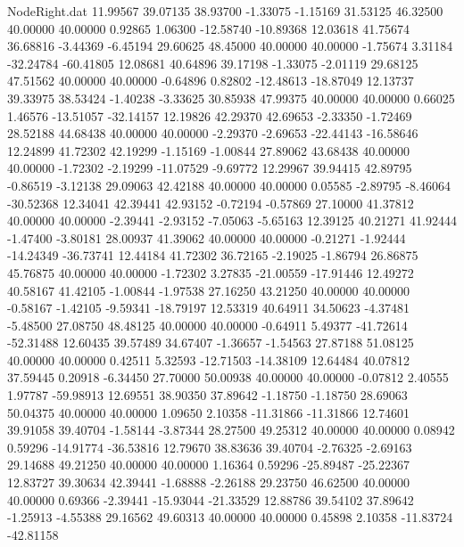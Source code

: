 \begin{filecontents}{NodeRight.dat}
  11.99567   39.07135   38.93700    -1.33075   -1.15169   31.53125   46.32500   40.00000   40.00000    0.92865    1.06300  -12.58740  -10.89368
  12.03618   41.75674   36.68816    -3.44369   -6.45194   29.60625   48.45000   40.00000   40.00000   -1.75674    3.31184  -32.24784  -60.41805
  12.08681   40.64896   39.17198    -1.33075   -2.01119   29.68125   47.51562   40.00000   40.00000   -0.64896    0.82802  -12.48613  -18.87049
  12.13737   39.33975   38.53424    -1.40238   -3.33625   30.85938   47.99375   40.00000   40.00000    0.66025    1.46576  -13.51057  -32.14157
  12.19826   42.29370   42.69653    -2.33350   -1.72469   28.52188   44.68438   40.00000   40.00000   -2.29370   -2.69653  -22.44143  -16.58646
  12.24899   41.72302   42.19299    -1.15169   -1.00844   27.89062   43.68438   40.00000   40.00000   -1.72302   -2.19299  -11.07529   -9.69772
  12.29967   39.94415   42.89795    -0.86519   -3.12138   29.09063   42.42188   40.00000   40.00000    0.05585   -2.89795   -8.46064  -30.52368
  12.34041   42.39441   42.93152    -0.72194   -0.57869   27.10000   41.37812   40.00000   40.00000   -2.39441   -2.93152   -7.05063   -5.65163
  12.39125   40.21271   41.92444    -1.47400   -3.80181   28.00937   41.39062   40.00000   40.00000   -0.21271   -1.92444  -14.24349  -36.73741
  12.44184   41.72302   36.72165    -2.19025   -1.86794   26.86875   45.76875   40.00000   40.00000   -1.72302    3.27835  -21.00559  -17.91446
  12.49272   40.58167   41.42105    -1.00844   -1.97538   27.16250   43.21250   40.00000   40.00000   -0.58167   -1.42105   -9.59341  -18.79197
  12.53319   40.64911   34.50623    -4.37481   -5.48500   27.08750   48.48125   40.00000   40.00000   -0.64911    5.49377  -41.72614  -52.31488
  12.60435   39.57489   34.67407    -1.36657   -1.54563   27.87188   51.08125   40.00000   40.00000    0.42511    5.32593  -12.71503  -14.38109
  12.64484   40.07812   37.59445     0.20918   -6.34450   27.70000   50.00938   40.00000   40.00000   -0.07812    2.40555    1.97787  -59.98913
  12.69551   38.90350   37.89642    -1.18750   -1.18750   28.69063   50.04375   40.00000   40.00000    1.09650    2.10358  -11.31866  -11.31866
  12.74601   39.91058   39.40704    -1.58144   -3.87344   28.27500   49.25312   40.00000   40.00000    0.08942    0.59296  -14.91774  -36.53816
  12.79670   38.83636   39.40704    -2.76325   -2.69163   29.14688   49.21250   40.00000   40.00000    1.16364    0.59296  -25.89487  -25.22367
  12.83727   39.30634   42.39441    -1.68888   -2.26188   29.23750   46.62500   40.00000   40.00000    0.69366   -2.39441  -15.93044  -21.33529
  12.88786   39.54102   37.89642    -1.25913   -4.55388   29.16562   49.60313   40.00000   40.00000    0.45898    2.10358  -11.83724  -42.81158

\end{filecontents}
